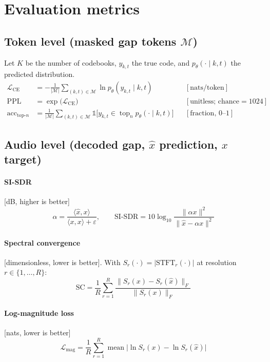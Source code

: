 \documentclass[11pt]{article}
\begin{document}
\section*{Evaluation metrics}

\subsection*{Token level (masked gap tokens $\mathcal{M}$)}
Let $K$ be the number of codebooks, $y_{k,t}$ the true code, and $p_\theta(\cdot\mid k,t)$ the predicted distribution.
\begin{align}
\mathcal{L}_{\mathrm{CE}} &= -\frac{1}{|\mathcal{M}|}\sum_{(k,t)\in\mathcal{M}} \ln p_\theta(y_{k,t}\mid k,t) && [\text{nats/token}]\\
\mathrm{PPL} &= \exp\!\big(\mathcal{L}_{\mathrm{CE}}\big) && [\text{unitless; chance}=1024]\\
\mathrm{acc}_{\text{top-}n} &= \frac{1}{|\mathcal{M}|}\sum_{(k,t)\in\mathcal{M}} \mathbb{1}\!\big[y_{k,t}\in \operatorname{top}_n p_\theta(\cdot\mid k,t)\big] && [\text{fraction},\,0\text{--}1]
\end{align}

\subsection*{Audio level (decoded gap, $\hat{x}$ prediction, $x$ target)}
\paragraph{SI-SDR} [dB, higher is better]
\begin{equation}
\alpha=\frac{\langle \hat{x},x\rangle}{\langle x,x\rangle+\varepsilon},\qquad
\mathrm{SI\text{-}SDR}=10\log_{10}\frac{\|\alpha x\|^2}{\|\hat{x}-\alpha x\|^2}
\end{equation}

\paragraph{Spectral convergence} [dimensionless, lower is better]. With $S_r(\cdot)=|\mathrm{STFT}_r(\cdot)|$ at resolution $r\in\{1,\dots,R\}$:
\begin{equation}
\mathrm{SC}=\frac{1}{R}\sum_{r=1}^{R}\frac{\|S_r(x)-S_r(\hat{x})\|_F}{\|S_r(x)\|_F}
\end{equation}

\paragraph{Log-magnitude loss} [nats, lower is better]
\begin{equation}
\mathcal{L}_{\mathrm{mag}}=\frac{1}{R}\sum_{r=1}^{R}\operatorname{mean}\big|\ln S_r(x)-\ln S_r(\hat{x})\big|
\end{equation}
\end{document}
